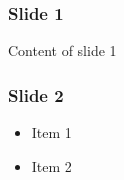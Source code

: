 \documentclass[english,svgnames,notes=hide,14pt]{beamer}
\title{\large\presentationtitle}
\author{Author Name\\
		\small Supervised by Name\\
		\small University
	}
\date{}
\begin{document}
\thispagestyle{empty}
\begin{frame}
  \titlepage
\end{frame}




\begin{frame}
	\frametitle{Slide 1}

	Content of slide 1
\end{frame}


\begin{frame}
	\frametitle{Slide 2}

	\begin{itemize}
		\item Item 1
		\item Item 2
	\end{itemize}
\end{frame}
\end{document}

